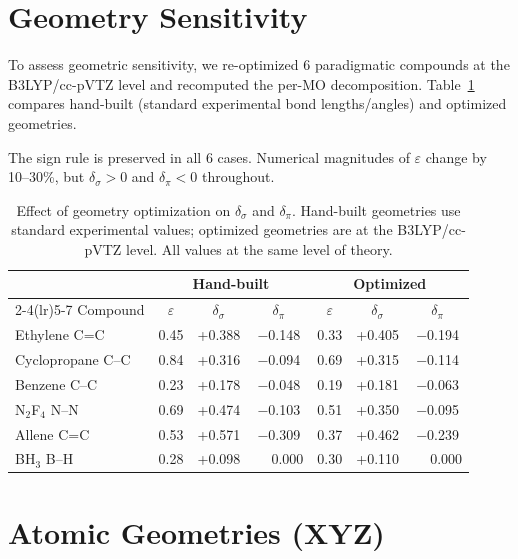 \documentclass[11pt,a4paper]{article}
\begin{document}
\section{Geometry Sensitivity}
\label{sec:SI_geom}

To assess geometric sensitivity, we re-optimized 6 paradigmatic compounds
at the B3LYP/cc-pVTZ level and recomputed the per-MO decomposition.
Table~\ref{tab:SI_geom} compares hand-built (standard experimental
bond lengths/angles) and optimized geometries.

The sign rule is preserved in all 6 cases. Numerical magnitudes of
$\varepsilon$ change by 10--30\%, but $\delta_\sigma > 0$ and
$\delta_\pi < 0$ throughout.

\begin{table}[h!]
\centering
\caption{Effect of geometry optimization on $\delta_\sigma$ and $\delta_\pi$.
Hand-built geometries use standard experimental values; optimized
geometries are at the B3LYP/cc-pVTZ level. All values at the same
level of theory.}
\label{tab:SI_geom}
\begin{tabular}{lcccccc}
\toprule
& \multicolumn{3}{c}{Hand-built} & \multicolumn{3}{c}{Optimized} \\
\cmidrule(lr){2-4}\cmidrule(lr){5-7}
Compound & $\varepsilon$ & $\delta_\sigma$ & $\delta_\pi$ &
$\varepsilon$ & $\delta_\sigma$ & $\delta_\pi$ \\
\midrule
Ethylene C=C       & 0.45 & +0.388 & $-$0.148 & 0.33 & +0.405 & $-$0.194 \\
Cyclopropane C--C  & 0.84 & +0.316 & $-$0.094 & 0.69 & +0.315 & $-$0.114 \\
Benzene C--C       & 0.23 & +0.178 & $-$0.048 & 0.19 & +0.181 & $-$0.063 \\
N$_2$F$_4$ N--N    & 0.69 & +0.474 & $-$0.103 & 0.51 & +0.350 & $-$0.095 \\
Allene C=C         & 0.53 & +0.571 & $-$0.309 & 0.37 & +0.462 & $-$0.239 \\
BH$_3$ B--H        & 0.28 & +0.098 & $\phantom{-}$0.000 & 0.30 & +0.110 & $\phantom{-}$0.000 \\
\bottomrule
\end{tabular}
\end{table}

\section{Atomic Geometries (XYZ)}
\label{sec:SI_xyz}
\end{document}
